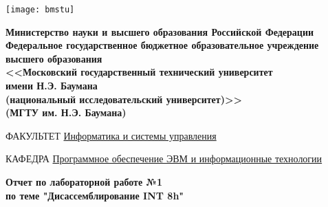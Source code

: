 \begin{titlepage}
    \thispagestyle{empty}

    \noindent\begin{minipage}{0.05\textwidth}
        \texttt{[image: bmstu]}
    \end{minipage}
    \hfill
    \begin{minipage}{0.85\textwidth}\raggedleft
        \begin{center}
            \fontsize{10pt}{0.3\baselineskip}\selectfont \textbf{Министерство науки и высшего образования Российской Федерации \\ Федеральное государственное бюджетное образовательное учреждение \\ высшего образования \\ <<Московский государственный технический университет \\ имени Н.Э. Баумана \\ (национальный исследовательский университет)>> \\ (МГТУ им. Н.Э. Баумана)}
        \end{center}
    \end{minipage}

    \begin{center}
        \fontsize{12pt}{0.1\baselineskip}\selectfont
        \noindent\makebox[\linewidth]{\rule{\textwidth}{4pt}} \makebox[\linewidth]{\rule{\textwidth}{1pt}}
    \end{center}

    \begin{flushleft}
        \fontsize{12pt}{0.8\baselineskip}\selectfont

        ФАКУЛЬТЕТ \uline{
            \hfill
            Информатика и системы управления
            \hfill}

        КАФЕДРА \uline{\mbox{\hspace{4mm}}
            \hfill
            Программное обеспечение ЭВМ и информационные технологии
            \hfill}
    \end{flushleft}

    \vfill
    
    \begin{center}
        \fontsize{19pt}{\baselineskip}\selectfont

        \textbf{Отчет по лабораторной работе №1} \\
        \textbf{по теме "Дисассемблирование INT 8h"}
    \end{center}


\end{titlepage}
